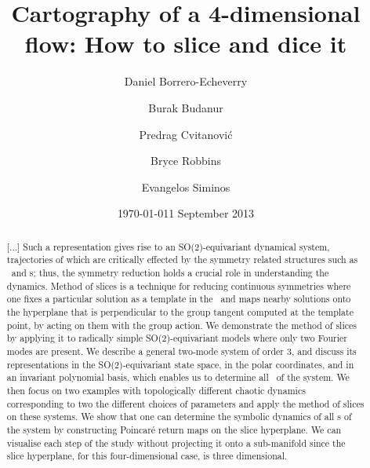\documentclass[aip,cha,
reprint,
secnumarabic,
nofootinbib, tightenlines,
nobibnotes, showkeys, showpacs,
groupedaddress,
]{revtex4-1}
\begin{document}
\title[Low-dimensional cartography]
{Cartography of a 4-dimensional flow: How to slice and dice it}

\author{Daniel Borrero-Echeverry}
\author{Burak Budanur}
\author{Predrag Cvitanovi\'{c}}
\author{Bryce Robbins} %
\author{Evangelos Siminos}
    \ifdraft
\date{\today}
    \else
\date{1 September 2013}
   \fi


    \begin{abstract}
[...]
Such a representation gives rise to an SO(2)-equivariant dynamical system,
trajectories of which are critically effected by the symmetry related structures
such as \reqva\ and \rpo s; thus, the symmetry reduction holds a crucial role
in understanding the dynamics. Method of slices is a technique for reducing
continuous symmetries where one fixes a particular solution as a template in
the \statesp\ and maps nearby solutions onto the hyperplane that is perpendicular
to the group tangent computed at the template point, by acting on them with
the group action. We demonstrate the method of slices by applying it to
radically simple SO(2)-equivariant models where only two Fourier modes are present.
We describe a general two-mode system of order 3, and discuss its representations
in the SO(2)-equivariant state space, in the polar coordinates, and
in an invariant polynomial basis, which enables us to determine all \reqva\ 
of the system. We then focus on two examples with topologically
different chaotic dynamics corresponding to two the different choices of
parameters and apply the method of slices on these systems. We show
that one can determine the symbolic dynamics of
all \rpo s of the system by constructing Poincar\'e
return maps on the slice hyperplane. We can visualise each step of the study
without projecting it onto a sub-manifold since the slice hyperplane, for
this four-dimensional case, is three dimensional.
    \end{abstract}
\end{document}
